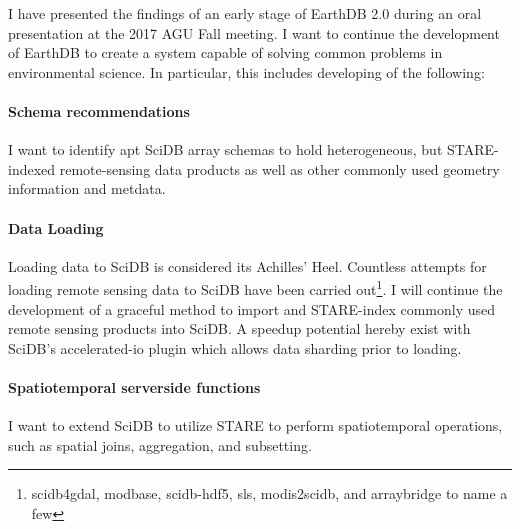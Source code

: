 \documentclass[letterpaper, parskip=half]{scrartcl}
\begin{document}
I have presented the findings of an early stage of EarthDB 2.0 during an oral presentation at the 2017 \gls{AGU} Fall meeting. I want to continue the development of EarthDB to create a system capable of solving common problems in environmental science. In particular, this includes developing of the following:

\paragraph{Schema recommendations}
I want to identify apt SciDB array schemas to hold heterogeneous, but STARE-indexed remote-sensing data products as well as other commonly used geometry information and metdata.


\paragraph{Data Loading}
Loading data to SciDB is considered its Achilles' Heel. Countless attempts for loading remote sensing data to SciDB have been carried out\footnote{scidb4gdal, modbase, scidb-hdf5, sls, modis2scidb, and arraybridge to name a few}. 
I will continue the development of a graceful method to import and STARE-index commonly used remote sensing products into SciDB. A speedup potential hereby exist with SciDB's accelerated-io plugin which allows data sharding prior to loading. 



\paragraph{Spatiotemporal serverside functions}
I want to extend SciDB to utilize STARE to perform spatiotemporal operations, such as spatial joins, aggregation, and subsetting.
\end{document}
